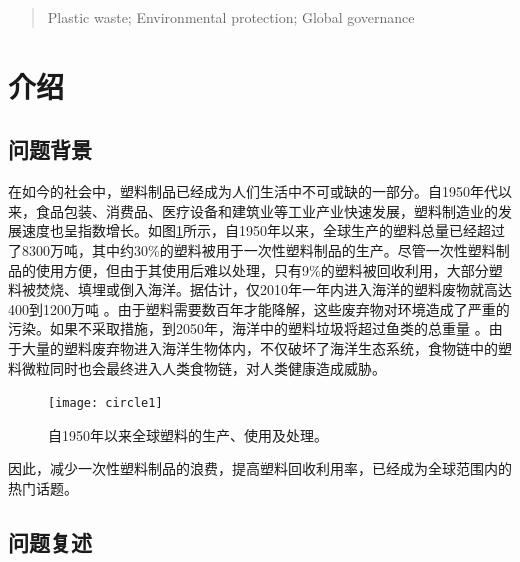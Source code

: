 \documentclass[UTF8, fontset=windows]{mcmthesis}
\begin{document}
\begin{abstract}
\begin{keywords}
Plastic waste; Environmental protection; Global governance
\end{keywords}
\end{abstract}
\maketitle
\tableofcontents
\newpage
\section{介绍}
\subsection{问题背景}

在如今的社会中，塑料制品已经成为人们生活中不可或缺的一部分。自1950年代以来，食品包装、消费品、医疗设备和建筑业等工业产业快速发展，塑料制造业的发展速度也呈指数增长。如图\ref{fig:circle1}所示，自1950年以来，全球生产的塑料总量已经超过了8300万吨，其中约30\%的塑料被用于一次性塑料制品的生产。尽管一次性塑料制品的使用方便，但由于其使用后难以处理，只有9\%的塑料被回收利用，大部分塑料被焚烧、填埋或倒入海洋。据估计，仅2010年一年内进入海洋的塑料废物就高达400到1200万吨 \cite{geyer2017production}。由于塑料需要数百年才能降解，这些废弃物对环境造成了严重的污染。如果不采取措施，到2050年，海洋中的塑料垃圾将超过鱼类的总重量 \cite{jambeck2015plastic}。由于大量的塑料废弃物进入海洋生物体内，不仅破坏了海洋生态系统，食物链中的塑料微粒同时也会最终进入人类食物链，对人类健康造成威胁。

\begin{figure}[h]
\centering
\texttt{[image: circle1]}
\caption{自1950年以来全球塑料的生产、使用及处理。 \cite{geyer2017production}} 
\label{fig:circle1}
\end{figure}

因此，减少一次性塑料制品的浪费，提高塑料回收利用率，已经成为全球范围内的热门话题。

\subsection{问题复述}
\end{document}
